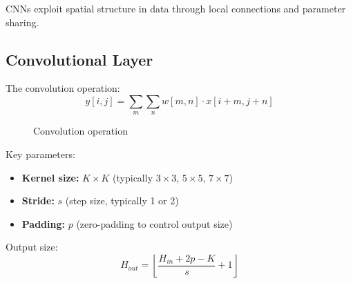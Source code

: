 CNNs exploit spatial structure in data through local connections and parameter sharing.

\subsection{Convolutional Layer}

The convolution operation:
\begin{equation}
y[i,j] = \sum_{m}\sum_{n} w[m,n] \cdot x[i+m, j+n]
\end{equation}

\begin{figure}[htbp]
    \centering
    \caption{Convolution operation}
    \label{fig:convolution}
\end{figure}

Key parameters:
\begin{itemize}
    \item \textbf{Kernel size:} $K \times K$ (typically $3 \times 3$, $5 \times 5$, $7 \times 7$)
    \item \textbf{Stride:} $s$ (step size, typically 1 or 2)
    \item \textbf{Padding:} $p$ (zero-padding to control output size)
\end{itemize}

Output size:
\begin{equation}
H_{out} = \left\lfloor \frac{H_{in} + 2p - K}{s} + 1 \right\rfloor
\end{equation}

